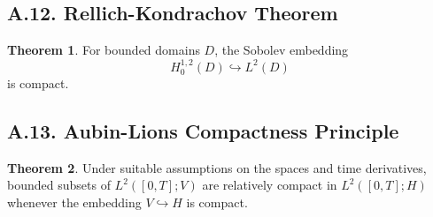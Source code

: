 \documentclass[11pt]{article}
\theoremstyle{definition}
\newtheorem{theorem}{Theorem}
\theoremstyle{remark}
\begin{document}
\subsection*{A.12. Rellich-Kondrachov Theorem}
\begin{theorem}
For bounded domains \(D\), the Sobolev embedding
\[
H_0^{1,2}(D)\hookrightarrow L^2(D)
\]
is compact.
\end{theorem}

\subsection*{A.13. Aubin-Lions Compactness Principle}
\begin{theorem}
Under suitable assumptions on the spaces and time derivatives, bounded subsets of \(L^2([0,T];V)\) are relatively compact in \(L^2([0,T];H)\) whenever the embedding \(V\hookrightarrow H\) is compact.
\end{theorem}
\end{document}
